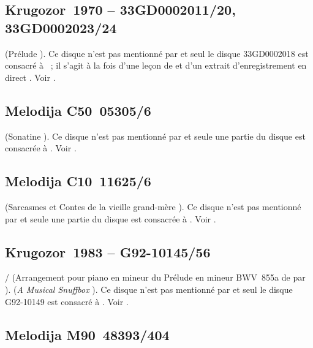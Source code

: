 \subsection{Krugozor~1970  -- 33GD0002011/20, 33GD0002023/24}

\Scriabine{} (Prélude  ).
Ce disque n'est pas mentionné par \INikonovich{}
\citep[voir][]{Nikonovich11} et seul le disque 33GD0002018 est consacré à
\VSofronitsky{}~; il s'agit à la fois d'une leçon de \VSofronitsky{} et d'un
extrait d'enregistrement en direct \citep[voir][]{Lobanov70}.
Voir \citet{Recordssu}.

\subsection{Melodija C50~05305/6}

\Kabalevski{} (Sonatine  ).
Ce disque n'est pas mentionné par \INikonovich{}
\citep[voir][]{Nikonovich11} et seule une partie du disque est consacrée à
\VSofronitsky{}.
Voir \citet{Recordssu}.

\subsection{Melodija C10~11625/6}

\Prokofiev{} (Sarcasmes  et Contes de la vieille grand-mère
).
Ce disque n'est pas mentionné par \INikonovich{}
\citep[voir][]{Nikonovich11} et seule une partie du disque est consacrée à
\VSofronitsky{}.
Voir \citet{Recordssu}.

\subsection{Krugozor~1983  -- G92-10145/56}

\Bach{}/\Ziloti{} (Arrangement pour piano en \kB mineur du Prélude
 en \kE mineur BWV~855a de \Bach{} par \Ziloti{}).
\Liadov{} (\emph{A Musical Snuffbox} ).
Ce disque n'est pas mentionné par \INikonovich{}
\citep[voir][]{Nikonovich11} et seul le disque G92-10149 est consacré à
\VSofronitsky{}.
Voir \citet{Recordssu}.

\subsection{Melodija M90~48393/404}

